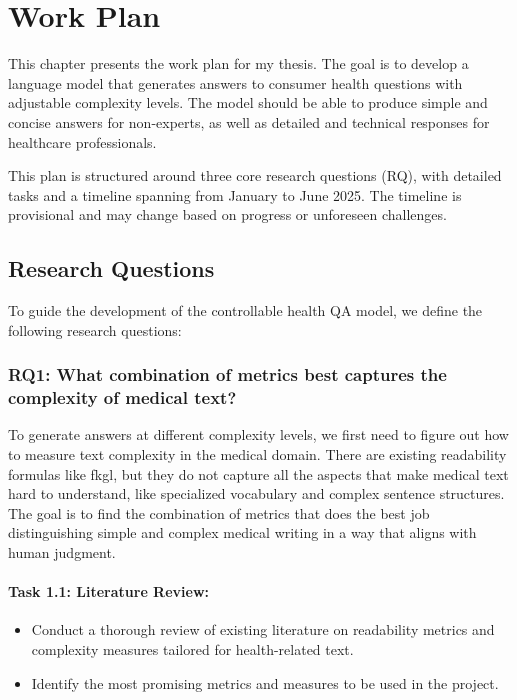 \chapter{Work Plan}
\label{c3}

This chapter presents the work plan for my thesis.
The goal is to develop a language model that generates answers to consumer health questions with adjustable complexity levels.
The model should be able to produce simple and concise answers for non-experts, as well as detailed and technical responses for healthcare professionals.

This plan is structured around three core research questions (RQ), with detailed tasks and a timeline spanning from January to June 2025. 
The timeline is provisional and may change based on progress or unforeseen challenges.

\section{Research Questions}
To guide the development of the controllable health QA model, we define the following research questions:

\subsection*{RQ1: What combination of metrics best captures the complexity of medical text?}

To generate answers at different complexity levels, we first need to figure out how to measure text complexity in the medical domain. 
There are existing readability formulas like \gls{fkgl}, but they do not capture all the aspects that make medical text hard to understand, like specialized vocabulary and complex sentence structures. 
The goal is to find the combination of metrics that does the best job distinguishing simple and complex medical writing in a way that aligns with human judgment.


\subsubsection*{Task 1.1: Literature Review:}

\begin{itemize}
    \item Conduct a thorough review of existing literature on readability metrics and complexity measures tailored for health-related text.
    \item Identify the most promising metrics and measures to be used in the project.
\end{itemize}

